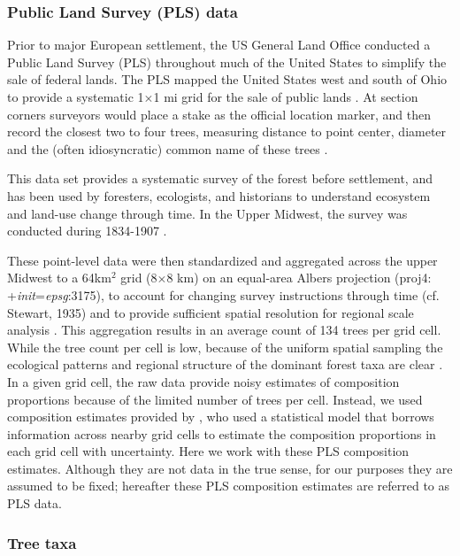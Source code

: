 \documentclass[12pt]{article}
\begin{document}
\subsubsection{Public Land Survey (PLS) data}
Prior to major European settlement, the US General Land Office
conducted a Public Land Survey (PLS) throughout much of the United
States to simplify the sale of federal lands. The PLS mapped the
United States west and south of Ohio to provide a systematic
1$\times$1 mi grid for the sale of public lands
\citep{stewart1935public, white1983history}. At section corners
surveyors would place a stake as the official location marker, and
then record the closest two to four trees, measuring distance to point
center, diameter and the (often idiosyncratic) common name of these
trees \citep{mladenoff2002narrowing}.  

This data set provides a systematic survey of the forest
before settlement, and has been used by foresters, ecologists, and
historians to understand ecosystem and land-use change through
time. In the Upper Midwest, the survey was conducted during 1834-1907
\citep{stewart1935public}. 

These point-level data were then standardized and aggregated across
the upper Midwest to a 64km$^2$ grid (8$\times$8 km) on an equal-area
Albers projection (proj4: +\textit{init}=\textit{epsg}:3175), to
account for changing survey instructions through time (cf. Stewart,
1935) and to provide sufficient spatial resolution for regional scale
analysis \citep{goring_witness}.  This aggregation results in an
average count of 134 trees per grid cell. While the tree count per
cell is low, because of the uniform spatial sampling the ecological
patterns and regional structure of the dominant forest taxa are clear
\citep{goring_witness}. In a given grid cell, the raw data provide
noisy estimates of composition proportions because of the limited
number of trees per cell. Instead, we used composition estimates
provided by \citet{paciorek2015}, who used a statistical model that
borrows information across nearby grid cells to estimate the
composition proportions in each grid cell with uncertainty. Here we
work with these PLS composition estimates. Although they are not data
in the true sense, for our purposes they are assumed to be fixed;
hereafter these PLS composition estimates are referred to as PLS data.

\subsubsection{Tree taxa}
\end{document}
